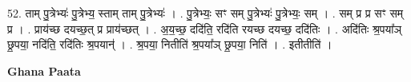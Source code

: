 \documentclass[17pt]{extarticle}
\begin{document}
52. ताम् पु॒त्रेभ्यः॑ पु॒त्रेभ्य॒ स्ताम् ताम् पु॒त्रेभ्यः॑ । . पु॒त्रेभ्यः॒ सꣳ सम् पु॒त्रेभ्यः॑ पु॒त्रेभ्यः॒ सम् । . सम् प्र प्र सꣳ सम् प्र । . प्राय॑च्छ दयच्छ॒त् प्र प्राय॑च्छत् । . अ॒य॒च्छ॒ ददि॑ति॒ रदि॑ति रयच्छ दयच्छ॒ ददि॑तिः । . अदि॑तिः श्र॒पया᳚ञ् छ्र॒पया॒ नदि॑ति॒ रदि॑तिः श्र॒पयान्॑ । . श्र॒पया॒ नितीति॑ श्र॒पया᳚ञ् छ्र॒पया॒ निति॑ । . इतीतीति॑ । \newline

\textbf{Ghana Paata } \newline
\end{document}
